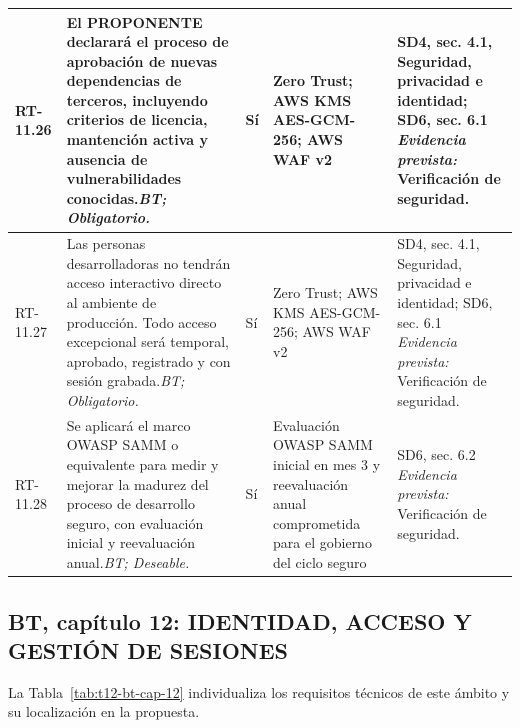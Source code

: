 \begin{paginaHorizontalSynaptix}
\begin{longtable}{|L{0.09\AnchoMatrizTDoce}|L{0.385\AnchoMatrizTDoce}|L{0.065\AnchoMatrizTDoce}|L{0.18\AnchoMatrizTDoce}|L{0.28\AnchoMatrizTDoce}|}
RT-\allowbreak{}11.\allowbreak{}26 &
El PROPONENTE declarará el proceso de aprobación de nuevas dependencias de terceros, incluyendo criterios de licencia, mantención activa y ausencia de vulnerabilidades conocidas.\newline\textit{BT; Obligatorio.} &
Sí &
Zero Trust; AWS KMS AES-GCM-256; AWS WAF v2 &
SD4, sec. 4.1, Seguridad, privacidad e identidad; SD6, sec. 6.1 \newline\textit{Evidencia prevista:} Verificación de seguridad. \\ \hline

RT-\allowbreak{}11.\allowbreak{}27 &
Las personas desarrolladoras no tendrán acceso interactivo directo al ambiente de producción. Todo acceso excepcional será temporal, aprobado, registrado y con sesión grabada.\newline\textit{BT; Obligatorio.} &
Sí &
Zero Trust; AWS KMS AES-GCM-256; AWS WAF v2 &
SD4, sec. 4.1, Seguridad, privacidad e identidad; SD6, sec. 6.1 \newline\textit{Evidencia prevista:} Verificación de seguridad. \\ \hline

RT-\allowbreak{}11.\allowbreak{}28 &
Se aplicará el marco OWASP SAMM o equivalente para medir y mejorar la madurez del proceso de desarrollo seguro, con evaluación inicial y reevaluación anual.\newline\textit{BT; Deseable.} &
Sí &
Evaluación OWASP SAMM inicial en mes 3 y reevaluación anual comprometida para el gobierno del ciclo seguro &
SD6, sec. 6.2 \newline\textit{Evidencia prevista:} Verificación de seguridad. \\ \hline

\end{longtable}


\subsection*{BT, capítulo 12: IDENTIDAD, ACCESO Y GESTIÓN DE SESIONES}


La Tabla~\ref{tab:t12-bt-cap-12} individualiza los requisitos técnicos de este ámbito y su localización en la propuesta.

\begin{longtable}{|L{0.09\AnchoMatrizTDoce}|L{0.385\AnchoMatrizTDoce}|L{0.065\AnchoMatrizTDoce}|L{0.18\AnchoMatrizTDoce}|L{0.28\AnchoMatrizTDoce}|}


\end{longtable}
\end{paginaHorizontalSynaptix}
